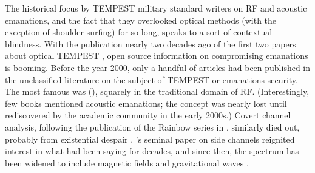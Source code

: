 \documentclass[a4paper,twoside,11pt,openany]{book}
\begin{document}
The historical focus by TEMPEST military standard writers on RF and acoustic
emanations, and the fact that they overlooked optical methods (with the
exception of shoulder surfing) for so long, speaks to a sort of contextual
blindness. With the publication nearly two decades ago of the first two papers
about optical TEMPEST \cite{Loughry2002a,Kuhn2002}, open source information on
compromising emanations is booming. Before the year 2000, only a handful of
articles had been published in the unclassified literature on the subject of
TEMPEST or emanations security. The most famous was \citeauthor{vanEck1985}
(\citeyear{vanEck1985}), squarely in the traditional domain of RF.
(Interestingly, few books mentioned acoustic emanations; the concept was nearly
lost until rediscovered by the academic community in the early 2000s.) Covert
channel analysis, following the publication of the Rainbow series in
\citeyear{NCSC-TG-030}, similarly died out, probably from existential despair
\cite{NCSC-TG-030}. \citeauthor{Kocher1999}'s seminal paper on side channels
reignited interest in what \cite{Wright1987} had been saying for decades, and
since then, the spectrum has been widened to include magnetic fields and
gravitational waves \cite{Guri2018b,Abbott2016b}.

\cleardoublepage

\end{document}
